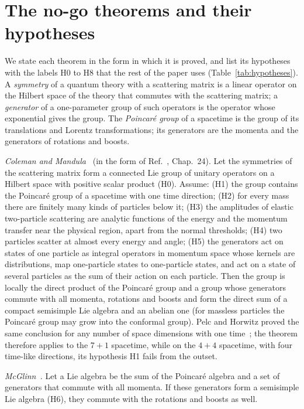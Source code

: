 \section{The no-go theorems and their hypotheses}
\label{sec:theorems}

We state each theorem in the form in which it is proved, and list its hypotheses with the labels
H0 to H8 that the rest of the paper uses (Table~\ref{tab:hypotheses}). A \emph{symmetry} of a
quantum theory with a scattering matrix is a linear operator on the Hilbert space of the theory
that commutes with the scattering matrix; a \emph{generator} of a one-parameter group of such
operators is the operator whose exponential gives the group. The \emph{Poincar\'e group} of a
spacetime is the group of its translations and Lorentz transformations; its generators are the
momenta and the generators of rotations and boosts.

\emph{Coleman and Mandula~\cite{ColemanMandula1967}} (in the form of Ref.~\cite{WeinbergQFT3},
Chap.~24). Let the symmetries of the scattering matrix form a connected Lie group of unitary operators
on a Hilbert space with positive scalar product (H0). Assume: (H1) the group contains the Poincar\'e
group of a spacetime with one time direction; (H2) for every mass there are finitely many kinds of
particles below it; (H3) the amplitudes of elastic two-particle scattering are analytic functions of
the energy and the momentum transfer near the physical region, apart from the normal thresholds;
(H4) two particles scatter at almost every energy and angle; (H5) the generators act on states of one
particle as integral operators in momentum space whose kernels are distributions, map one-particle
states to one-particle states, and act on a state of several particles as the sum of their action
on each particle. Then the group is locally the direct product of the Poincar\'e group and a group
whose generators commute with all momenta, rotations and boosts and form the direct sum of a compact
semisimple Lie algebra and an abelian one (for massless particles the Poincar\'e group may grow into
the conformal group). Pelc and Horwitz proved the same conclusion for any number of space dimensions
with one time~\cite{PelcHorwitz1997}; the theorem therefore applies to the $7+1$ spacetime, while on
the $4+4$ spacetime, with four time-like directions, its hypothesis H1 fails from the outset.

\emph{McGlinn~\cite{McGlinn1964}.} Let a Lie algebra be the sum of the Poincar\'e algebra and a set of
generators that commute with all momenta. If these generators form a semisimple Lie algebra (H6),
they commute with the rotations and boosts as well.

